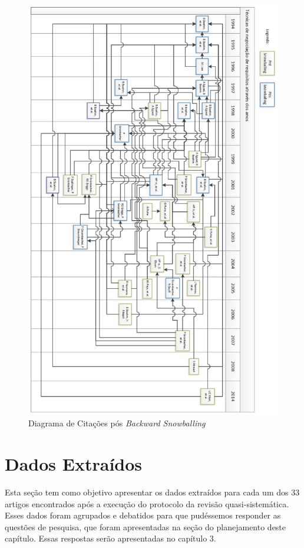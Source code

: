 \begin{figure}[ht]
 \centering
 \includegraphics[scale=0.48]{final_sb.eps}
 \caption{\label{fig:possb}Diagrama de Citações pós \textit{Backward
 Snowballing}}
\end{figure}

\FloatBarrier

\section{Dados Extraídos}

Esta seção tem como objetivo apresentar os dados extraídos para cada um dos 33
artigos encontrados após a execução do protocolo da revisão quasi-sistemática.
Esses dados foram agrupados e debatidos para que pudéssemos responder as
questões de pesquisa, que foram apresentadas na seção do planejamento deste capítulo.
Essas respostas serão apresentadas no capítulo 3.


